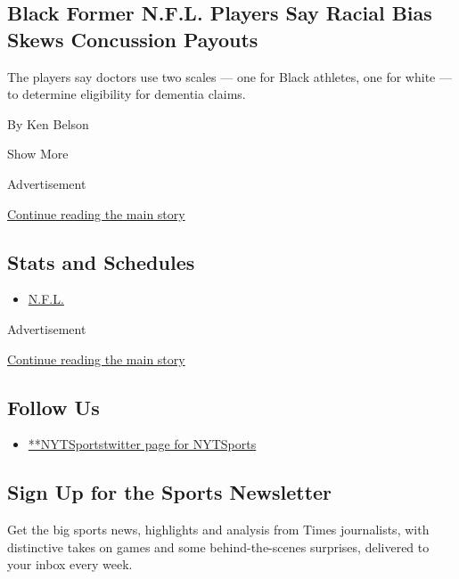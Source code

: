 \begin{enumerate}
  \hypertarget{black-former-nfl-players-say-racial-bias-skews-concussion-payouts}{%
  \subsection{Black Former N.F.L. Players Say Racial Bias Skews
  Concussion
  Payouts}\label{black-former-nfl-players-say-racial-bias-skews-concussion-payouts}}

  The players say doctors use two scales --- one for Black athletes, one
  for white --- to determine eligibility for dementia claims.

  By Ken Belson
\end{enumerate}

Show More

Advertisement

\protect\hyperlink{after-mid1}{Continue reading the main story}

\hypertarget{stats-and-schedules}{%
\subsection{Stats and Schedules}\label{stats-and-schedules}}

\begin{itemize}
\tightlist
\item
  \protect\hyperlink{}{N.F.L.}
\end{itemize}

Advertisement

\protect\hyperlink{after-mktg}{Continue reading the main story}

\hypertarget{follow-us}{%
\subsection{Follow Us}\label{follow-us}}

\begin{itemize}
\tightlist
\item
  \href{https://twitter.com/NYTSports}{**NYTSportstwitter page for
  NYTSports}
\end{itemize}

\hypertarget{sign-up-for-the-sports-newsletter}{%
\subsection{Sign Up for the Sports
Newsletter}\label{sign-up-for-the-sports-newsletter}}

Get the big sports news, highlights and analysis from Times journalists,
with distinctive takes on games and some behind-the-scenes surprises,
delivered to your inbox every week.

